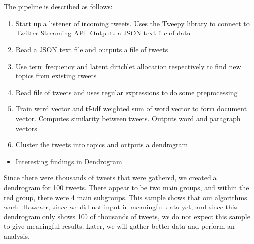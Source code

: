 \documentclass[10pt]{article}
\begin{document}
\\\\
The pipeline is described as follows:
\begin{enumerate}
	\item Start up a listener of incoming tweets. Uses the Tweepy library to connect to Twitter Streaming API. Outputs a JSON text file of data
	\item Read a JSON text file and outputs a file of tweets
	\item Use term frequency and latent dirichlet allocation respectively to find new topics from existing tweets
	\item Read file of tweets and uses regular expressions to do some preprocessing
	\item  Train word vector and tf-idf weighted sum of word vector to form document vector. Computes similarity between tweets. Outputs word and paragraph vectors
	\item Cluster the tweets into topics and outputs a dendrogram
\end{enumerate}

\begin{itemize}
	\item Interesting findings in Dendrogram
\end{itemize}
Since there were thousands of tweets that were gathered, we created a dendrogram for 100 tweets. There appear to be two main groups, and within the red group, there were 4 main subgroups. This sample shows that our algorithms work. However, since we did not input in meaningful data yet, and since this dendrogram only shows 100 of thousands of tweets, we do not expect this sample to give meaningful results. Later, we will gather better data and perform an analysis.
\end{document}

